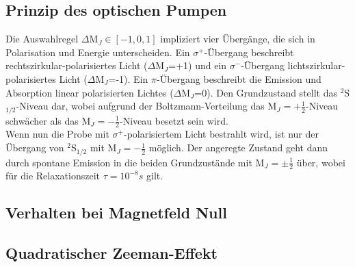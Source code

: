 \documentclass[]{scrartcl}
\begin{document}
\subsection{Prinzip des optischen Pumpen}
Die Auswahlregel $\Delta$M$_J\in[-1,0,1]$ impliziert vier Übergänge, die sich in Polarisation und Energie unterscheiden. Ein $\sigma^+$-Übergang beschreibt rechtszirkular-polarisiertes Licht ($\Delta$M$_J$=+1) und ein $\sigma^-$-Übergang lichtszirkular-polarisiertes Licht ($\Delta$M$_J$=-1). Ein $\pi$-Übergang beschreibt die Emission und Absorption linear polarisierten Lichtes ($\Delta$M$_J$=0). Den Grundzustand stellt das $^2$S$_{1/2}$-Niveau dar, wobei aufgrund der Boltzmann-Verteilung das M$_J=+\frac{1}{2}$-Niveau schwächer als das M$_J=-\frac{1}{2}$-Niveau besetzt sein wird. \\
Wenn nun die Probe mit $\sigma^+$-polarisiertem Licht bestrahlt wird, ist nur der Übergang von $^2$S$_{1/2}$ mit M$_J=-\frac{1}{2}$ möglich. Der angeregte Zustand geht dann durch spontane Emission in die beiden Grundzustände mit M$_J=\pm\frac{1}{2}$ über, wobei für die Relaxationszeit $\tau=10^{-8}\si{s}$ gilt.

\subsection{Verhalten bei Magnetfeld Null}

\subsection{Quadratischer Zeeman-Effekt}
\end{document}
